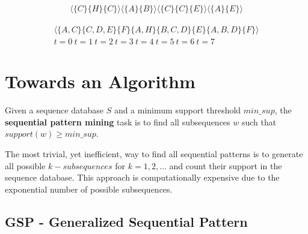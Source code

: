 \begin{gather*}
   \langle\{C\}\{H\}\{C\}\rangle
   \langle\{A\} \{B\}\rangle
   \langle\{C\} \{C\} \{E\}\rangle
   \langle\{A\} \{E\}\rangle
\end{gather*}

\begin{gather*}
   \langle\{A,C\}\{C,D,E\}\{F\}\{A,H\}\{B,C,D\}\{E\}\{A,B,D\}\{F\}\rangle\\
   t=0\ t=1\ t=2\ t=3\ t=4\ t=5\ t=6\ t=7
\end{gather*}

\section{Towards an Algorithm}
\begin{definition}
   Given a sequence database $S$ and a minimum support threshold $min\_sup$,
   the \textbf{sequential pattern mining} task is to find all subsequences $w$ such that $support(w) \geq min\_sup$.
\end{definition}

The most trivial, yet inefficient, way to find all sequential patterns is to generate all possible $k-subsequences$ for $k=1,2,\ldots$ and count their support in the sequence database. This approach is computationally expensive due to the exponential number of possible subsequences.

\subsection{GSP - Generalized Sequential Pattern}

